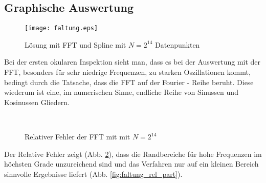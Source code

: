 \subsection{Graphische Auswertung}
\begin{figure}[h]
	\texttt{[image: faltung.eps]}
	\caption{Lösung mit FFT und Spline mit $N = 2^{14}$ Datenpunkten}
	\label{fig:fft}
\end{figure}
Bei der ersten okularen Inspektion sieht man, dass es bei der Auswertung mit der FFT, besonders für sehr niedrige Frequenzen, zu starken Oszillationen kommt, bedingt durch die Tatsache, dass die FFT auf der Fourier - Reihe beruht. Diese wiederum ist eine, im numerischen Sinne, endliche Reihe von Sinussen und Kosinussen Gliedern.
\begin{figure}[!htbp]
\centering
\caption{Relativer Fehler der FFT mit mit $N = 2^{14}$}\label{fig:faltung_rel}
\\
\end{figure}
Der Relative Fehler zeigt (Abb. \ref{fig:faltung_rel}), dass die Randbereiche für hohe Frequenzen im höchsten Grade unzureichend sind und das Verfahren nur auf ein kleinen Bereich sinnvolle Ergebnisse liefert (Abb. \ref{fig:faltung_rel_part}).
\newpage 
